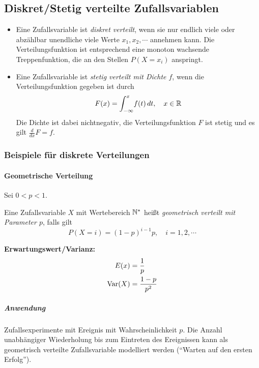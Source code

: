 		\subsection{Diskret/Stetig verteilte Zufallsvariablen}
			\begin{itemize}
				\item Eine Zufallsvariable ist \textit{diskret verteilt}, wenn sie nur endlich viele oder abzählbar unendliche viele Werte \( x_1, x_2, \cdots \) annehmen kann. Die Verteilungsfunktion ist entsprechend eine monoton wachsende Treppenfunktion, die an den Stellen \( P(X = x_i) \) anspringt.
				\item Eine Zufallsvariable ist \textit{stetig verteilt mit Dichte \(f\)}, wenn die Verteilungsfunktion gegeben ist durch
					\begin{equation*}
						F(x) = \int_{-\infty}^{x} \! f(t) \, dt, \quad x \in \mathbb{R}
					\end{equation*}
					Die Dichte ist dabei nichtnegativ, die Verteilungsfunktion \(F\) ist stetig und es gilt \( \frac{d}{dx} F = f \).
			\end{itemize}

			\subsubsection{Beispiele für diskrete Verteilungen}
				\paragraph{Geometrische Verteilung}
					Sei \( 0 < p < 1 \).

					Eine Zufallsvariable \(X\) mit Wertebereich \( \mathbb{N}^* \) heißt \textit{geometrisch verteilt mit Parameter \(p\)}, falls gilt
					\begin{equation*}
						P(X = i) = (1 - p) ^ { i - 1 } p, \quad i = 1, 2, \cdots
					\end{equation*}

					\textbf{Erwartungswert/Varianz:}
					\begin{align*}
						E(x)    & = \frac{1}{p}       \\
						\operatorname{Var}(X) & = \frac{1 - p}{p^2}
					\end{align*}

					\subparagraph{Anwendung}
						Zufallsexperimente mit Ereignis mit Wahrscheinlichkeit \(p\). Die Anzahl unabhängiger Wiederholung bis zum Eintreten des Ereignissen kann als geometrisch verteilte Zufallsvariable modelliert werden (\enquote{Warten auf den ersten Erfolg}).

